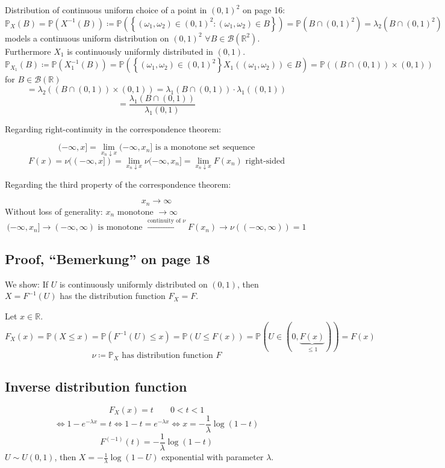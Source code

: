 \documentclass{article}
\newcommand{\set}[1]{\left\{#1\right\}}
\begin{document}
Distribution of continuous uniform choice of a point in $(0,1)^2$ on page 16:
\[ \mathbb P_X(B) = \mathbb P(X^{-1}(B)) \coloneqq \mathbb P(\set{(\omega_1, \omega_2) \in (0,1)^2: (\omega_1, \omega_2) \in B}) = \mathbb P(B \cap (0,1)^2) = \lambda_2(B \cap (0,1)^2) \]
models a continuous uniform distribution on $(0,1)^2$ $\forall B \in \mathcal B(\mathbb R^2)$.
Furthermore $X_1$ is continuously uniformly distributed in $(0,1)$.
\[ \mathbb P_{X_1}(B) \coloneqq \mathbb P(X_1^{-1}(B)) = \mathbb P(\set{(\omega_1, \omega_2) \in (0,1)^2}{X_1((\omega_1, \omega_2)) \in B}) = \mathbb P((B \cap (0,1)) \times (0,1)) \]
for $B \in \mathcal B(\mathbb R)$
\[ = \lambda_2 ((B \cap (0,1)) \times (0,1)) = \lambda_1 (B \cap (0,1)) \cdot \lambda_1((0,1)) \]
\[ = \frac{\lambda_1(B \cap (0,1))}{\lambda_1(0,1)} \]

Regarding right-continuity in the correspondence theorem:

\[ (-\infty, x] = \lim_{x_n \downarrow x} (-\infty, x_n] \text{ is a monotone set sequence} \]
\[ F(x) = \nu((-\infty, x]) = \lim_{x_n \downarrow x} \nu(-\infty, x_n] = \lim_{x_n \downarrow x} F(x_n) \text{ right-sided} \]

Regarding the third property of the correspondence theorem:

\[ x_n \to \infty \]
Without loss of generality: $x_n \text{ monotone } \to \infty$
\[ (-\infty, x_n] \to (-\infty, \infty) \text{ is monotone } \xrightarrow{\text{continuity of $\nu$}} F(x_n) \to \nu((-\infty, \infty)) = 1 \]

\subsection{Proof, \enquote{Bemerkung} on page 18}

We show: If $U$ is continuously uniformly distributed on $(0,1)$, then $X = F^{-1}(U)$ has the distribution function $F_X = F$.

Let $x \in \mathbb R$.
\[ F_X(x) = \mathbb P(X \leq x) = \mathbb P(F^{-1}(U) \leq x) = \mathbb P(U \leq F(x)) = \mathbb P(U \in (0, \underbrace{F(x)}_{\leq 1})) = F(x) \]
\[ \nu \coloneqq \mathbb P_X \text{ has distribution function } F \]

\subsection{Inverse distribution function}
\[ F_X(x) = t \qquad 0 < t < 1 \]
\[ \iff 1 - e^{-\lambda x} = t \iff 1 - t = e^{-\lambda x} \iff x = -\frac1\lambda \log(1 - t) \]
\[ F^{(-1)}(t) = -\frac{1}{\lambda} \log(1 - t) \]
$U \sim U(0,1)$, then $X = -\frac1\lambda \log(1 - U)$ exponential with parameter $\lambda$.
\end{document}
